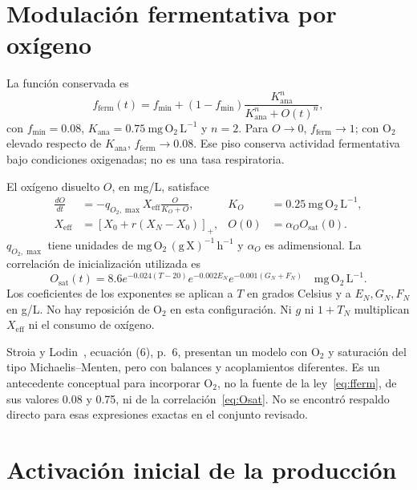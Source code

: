 \documentclass[11pt,a4paper]{article}
\newcommand{\fferm}{f_{\mathrm{ferm}}}
\newcommand{\pos}[1]{\left[#1\right]_+}
\begin{document}
\section{Modulación fermentativa por oxígeno}

La función conservada es
\begin{equation}
\fferm(t)=f_{\min}+(1-f_{\min})
\frac{K_{\mathrm{ana}}^n}{K_{\mathrm{ana}}^n+O(t)^n},
\label{eq:fferm}
\end{equation}
con $f_{\min}=0.08$, $K_{\mathrm{ana}}=0.75\ \mathrm{mg\,O_2\,L^{-1}}$
y $n=2$. Para $O\to0$, $\fferm\to1$; con O\(_2\) elevado respecto de
$K_{\mathrm{ana}}$, $\fferm\to0.08$. Ese piso conserva actividad fermentativa
bajo condiciones oxigenadas; no es una tasa respiratoria.

El oxígeno disuelto $O$, en mg/L, satisface
\begin{align}
\frac{dO}{dt}&=-q_{O_2,\max}X_{\mathrm{eff}}
\frac{O}{K_O+O},& K_O&=0.25\ \mathrm{mg\,O_2\,L^{-1}},\label{eq:oxygen}\\
X_{\mathrm{eff}}&=\pos{X_0+r(X_N-X_0)},&
O(0)&=\alpha_O O_{\mathrm{sat}}(0).\label{eq:Xeff}
\end{align}
$q_{O_2,\max}$ tiene unidades de
$\mathrm{mg\,O_2\,(g\,X)^{-1}\,h^{-1}}$ y $\alpha_O$ es adimensional.
La correlación de inicialización utilizada es
\begin{equation}
O_{\mathrm{sat}}(t)=8.6e^{-0.024(T-20)}e^{-0.002E_N}
e^{-0.001(G_N+F_N)}\quad\mathrm{mg\,O_2\,L^{-1}}.
\label{eq:Osat}
\end{equation}
Los coeficientes de los exponentes se aplican a $T$ en grados Celsius y a
$E_N,G_N,F_N$ en g/L. No hay reposición de O\(_2\) en esta configuración.
Ni $g$ ni $1+T_N$ multiplican $X_{\mathrm{eff}}$ ni el consumo de oxígeno.

Stroia y Lodin~\cite{stroia2025}, ecuación (6), p.~6, presentan un modelo con
O\(_2\) y saturación del tipo Michaelis--Menten, pero con balances y
acoplamientos diferentes. Es un antecedente conceptual para incorporar O\(_2\),
no la fuente de la ley~\eqref{eq:fferm}, de sus valores 0.08 y 0.75, ni de
la correlación~\eqref{eq:Osat}. No se encontró respaldo directo para esas
expresiones exactas en el conjunto revisado.

\section{Activación inicial de la producción}
\end{document}

